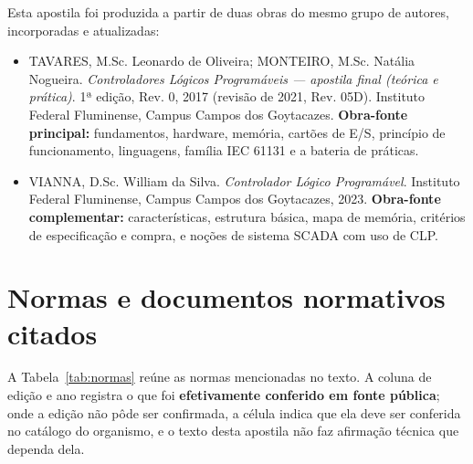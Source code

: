 Esta apostila foi produzida a partir de duas obras do mesmo grupo de autores, incorporadas e
atualizadas:

\begin{itemize}[leftmargin=1.2cm, label={}]
  \item TAVARES, M.Sc. Leonardo de Oliveira; MONTEIRO, M.Sc. Natália Nogueira. \emph{Controladores
        Lógicos Programáveis --- apostila final (teórica e prática)}. 1ª edição, Rev. 0, 2017
        (revisão de 2021, Rev. 05D). Instituto Federal Fluminense, Campus Campos dos Goytacazes.
        \textbf{Obra-fonte principal:} fundamentos, hardware, memória, cartões de E/S, princípio de
        funcionamento, linguagens, família IEC 61131 e a bateria de práticas.
  \item VIANNA, D.Sc. William da Silva. \emph{Controlador Lógico Programável}. Instituto Federal Fluminense,
        Campus Campos dos Goytacazes, 2023. \textbf{Obra-fonte complementar:} características,
        estrutura básica, mapa de memória, critérios de especificação e compra, e noções de sistema
        SCADA com uso de CLP.
\end{itemize}

\section{Normas e documentos normativos citados}

A Tabela~\ref{tab:normas} reúne as normas mencionadas no texto. A coluna de edição e ano registra o
que foi \textbf{efetivamente conferido em fonte pública}; onde a edição não pôde ser confirmada, a
célula indica que ela deve ser conferida no catálogo do organismo, e o texto desta apostila não faz
afirmação técnica que dependa dela.

